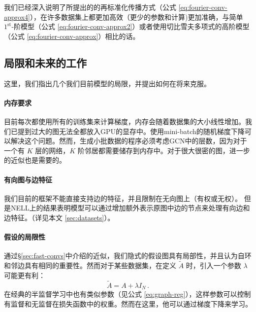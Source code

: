 \documentclass{article} %
\begin{document}

我们已经深入说明了所提出的的再标准化传播方式（公式 \ref{eq:fourier-conv-approx4}），在许多数据集上都更加高效（更少的参数和计算)更加准确，与简单 $1^{\text{st}}$-阶模型（公式 \ref{eq:fourier-conv-approx2}）或者使用切比雪夫多项式的高阶模型（公式 \ref{eq:fourier-conv-approx}）相比的话。

\subsection{局限和未来的工作}
这里，我们指出几个我们目前模型的局限，并提出如何在将来克服。

\paragraph{内存要求}
目前每次都使用所有的训练集来计算梯度，内存会随着数据集的大小线性增加。我们已提到过大的图无法全都放入GPU的显存中。使用mini-batch的随机梯度下降可以解决这个问题。然而，生成小批数据的程序必须考虑GCN中的层数，因为对于一个有 $K$ 层的网络，$K$ 阶邻居都需要储存到内存中。对于很大很密的图，进一步的近似也是需要的。

\paragraph{有向图与边特征}
我们目前的框架不能直接支持边的特征，并且限制在无向图上（有权或无权）。 但是NELL上的结果表明模型可以通过增加额外表示原图中边的节点来处理有向边和边特征。（详见本文 \ref{sec:datasets}）。%

\paragraph{假设的局限性}
通过\S\ref{sec:fast-convs}中介绍的近似，我们隐式的假设图具有局部性，并且认为自环和邻边具有相同的重要性。然而对于某些数据集，在定义 $\tilde{A}$ 时，引入一个参数 $\lambda$ 可能更有利：
\begin{equation}
  \tilde{A} = A + \lambda I_N\, .
\label{eq:trade-off-param}
\end{equation}
在经典的半监督学习中也有类似参数（见公式 \ref{eq:graph-reg}），这样参数可以控制有监督和无监督在损失函数中的权重。然而在这里，他可以通过梯度下降来学习。
\end{document}
